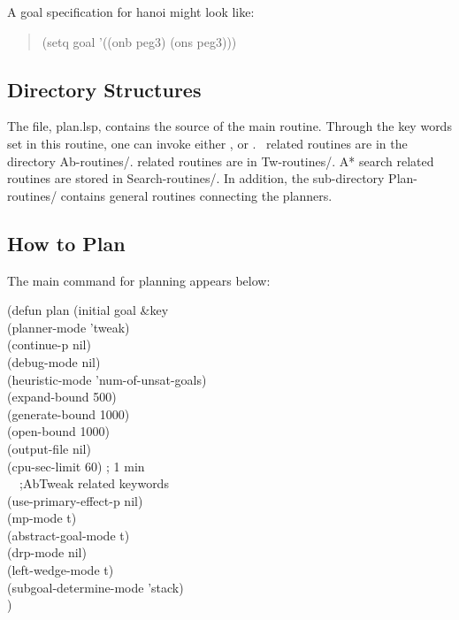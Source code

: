 A goal specification for hanoi might look like:
\begin{quote}
(setq goal '((onb peg3) (ons peg3)))
\end{quote}

\subsection{Directory Structures}
The file, plan.lsp, contains the source of the main routine.  Through
the key words set in this routine, one can invoke either \abtweak, or
\tweak.  \abtweak\ related routines are in the directory Ab-routines/.
\tweak related routines are in Tw-routines/.  A* search related
routines are stored in Search-routines/.  In addition, the sub-directory
Plan-routines/ contains general routines connecting the planners.

\subsection{How to Plan}
The main command for planning appears below:
\begin{tabbing}
(defun plan (initial goal \&key \= \\
			     
\>                                 (planner-mode 'tweak)\\
\> 					 (continue-p nil)\\
\>                                 (debug-mode      nil)\\
\>                                 (heuristic-mode 'num-of-unsat-goals)\\
\>                                 (expand-bound      500)\\
\>                                 (generate-bound   1000)\\
\>                                 (open-bound       1000)\\
\>  					(output-file nil)\\
\>		 		   (cpu-sec-limit 60)   ; 1 min\\
~~;AbTweak related keywords\\
\>                                 (use-primary-effect-p  nil)\\
\>                                 (mp-mode  t)\\
\>                                 (abstract-goal-mode  t) \\
\>                                 (drp-mode         nil)\\
\>                                 (left-wedge-mode t)\\
\>                                 (subgoal-determine-mode  'stack)\\

\>               )
\end{tabbing}

